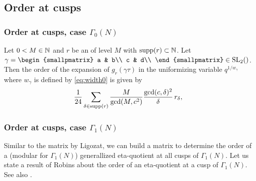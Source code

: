 \documentclass{article}
\begin{document}
\begin{AdditionalInformation}
\subsection{Order at cusps}

\subsubsection{Order at cusps, case $\Gamma_0(N)$}

\begin{Lemma}
  \cite[Proposition~3.2.8]{Ligozat_CourbesModulaires_1975}
  \label{thm:eta-order-0}
  Let $0<M\in\mathbb{N}$ and $r$ be an  of level
  $M$ with $\operatorname{supp}(r)\subset\mathbb{N}$.
  Let
  $\gamma = \begin{smallpmatrix} a & b\\ c & d\\ \end{smallpmatrix}
  \in \SL2Z$.
  Then the order of the expansion of $g_r(\gamma\tau)$ in the
  uniformizing variable $q^{1/w_\gamma}$ where $w_\gamma$ is defined by
  \eqref{eq:width0} is given by
  \begin{gather}
    \frac{1}{24}\sum_{\delta\in\operatorname{supp}(r)} \frac{M}{\gcd(M, c^2)}
                       \frac{\gcd(c,\delta)^2}{\delta} \, r_\delta,
    \label{eq:order-gamma0}
  \end{gather}
\end{Lemma}


\subsubsection{Order at cusps, case $\Gamma_1(N)$}

Similar to the matrix by Ligozat, we can build a matrix to determine
the order of a (modular for $\Gamma_1(N)$) generallized eta-quotient
at all cusps of $\Gamma_1(N)$.
%
Let us state a result of Robins about the order of an eta-quotient at
a cusp of $\Gamma_1(N)$. See also
\cite[Lemma~2.6]{ChenDuZhao_FindingModularFunctionsRamanujan_2019}.


\end{AdditionalInformation}
\end{document}
